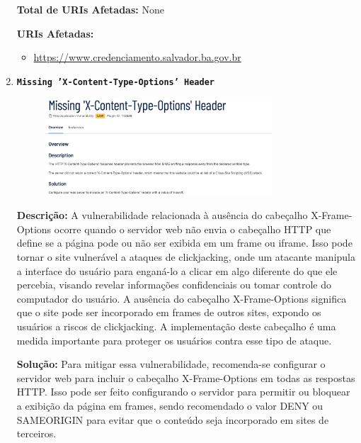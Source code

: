 \documentclass[a4paper,12pt]{article}
\begin{document}
\begin{enumerate}
\textbf{Total de URIs Afetadas:} None

\textbf{URIs Afetadas:}
\begin{itemize}
    \item \url{https://www.credenciamento.salvador.ba.gov.br}
\end{itemize}

\item \textbf{\texttt{Missing 'X-Content-Type-Options' Header}}

                        \begin{figure}[h!]
                        \centering
                        \includegraphics[width=0.8\textwidth]{assets/images-was/Vulnerabilidades Relacionadas a Configurações de Segurança HTTP E TLS/Missing 'X-Content-Type-Options' Header.png}
                        \end{figure}
                        \FloatBarrier
                        \textbf{Descrição:} A vulnerabilidade relacionada à ausência do cabeçalho X-Frame-Options ocorre quando o servidor web não envia o cabeçalho HTTP que define se a página pode ou não ser exibida em um frame ou iframe. Isso pode tornar o site vulnerável a ataques de clickjacking, onde um atacante manipula a interface do usuário para enganá-lo a clicar em algo diferente do que ele percebia, visando revelar informações confidenciais ou tomar controle do computador do usuário. A ausência do cabeçalho X-Frame-Options significa que o site pode ser incorporado em frames de outros sites, expondo os usuários a riscos de clickjacking. A implementação deste cabeçalho é uma medida importante para proteger os usuários contra esse tipo de ataque.

\textbf{Solução:} Para mitigar essa vulnerabilidade, recomenda-se configurar o servidor web para incluir o cabeçalho X-Frame-Options em todas as respostas HTTP. Isso pode ser feito configurando o servidor para permitir ou bloquear a exibição da página em frames, sendo recomendado o valor DENY ou SAMEORIGIN para evitar que o conteúdo seja incorporado em sites de terceiros.


\end{enumerate}
\end{document}
